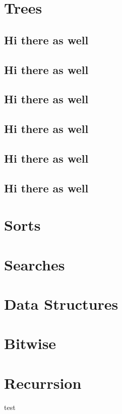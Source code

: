 \documentclass{article}   	%
\begin{document}
\section{Trees}
\subsection{Hi there as well}
\subsection{Hi there as well}
\subsection{Hi there as well}
\subsection{Hi there as well}
\subsection{Hi there as well}
\subsection{Hi there as well}

\section{Sorts}
\section{Searches}
\section{Data Structures}
\section{Bitwise}
\section{Recurrsion}

test
\end{document}
